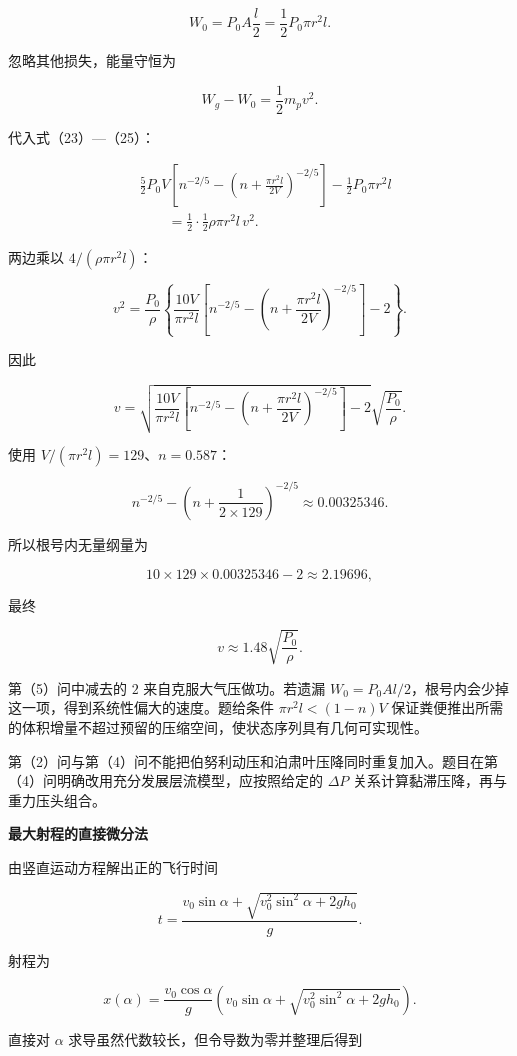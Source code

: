 \documentclass[12pt,a4paper,UTF8]{ctexart}
\begin{document}
\[
W_0=P_0A\frac l2=\frac12P_0\pi r^2l.
\tag{25}
\]

忽略其他损失，能量守恒为

\[
W_g-W_0=\frac12m_pv^2.
\tag{26}
\]

代入式（23）---（25）：

\[
\begin{aligned}
&\frac52P_0V\left[
n^{-2/5}
-\left(n+\frac{\pi r^2l}{2V}\right)^{-2/5}
\right]
-\frac12P_0\pi r^2l\\
&\qquad=\frac12\cdot\frac12\rho\pi r^2l\,v^2.
\end{aligned}
\]

两边乘以 \(4/(\rho\pi r^2l)\)：

\[
v^2=\frac{P_0}{\rho}\left\{
\frac{10V}{\pi r^2l}\left[
n^{-2/5}
-\left(n+\frac{\pi r^2l}{2V}\right)^{-2/5}
\right]-2
\right\}.
\]

因此

\[
\boxed{
v=\sqrt{
\frac{10V}{\pi r^2l}\left[
n^{-2/5}
-\left(n+\frac{\pi r^2l}{2V}\right)^{-2/5}
\right]-2
}\sqrt{\frac{P_0}{\rho}}
}.
\tag{27}
\]

使用 \(V/(\pi r^2l)=129\)、\(n=0.587\)：

\[
n^{-2/5}-\left(n+\frac1{2\times129}\right)^{-2/5}
\approx0.00325346.
\]

所以根号内无量纲量为

\[
10\times129\times0.00325346-2\approx2.19696,
\]

最终

\[
\boxed{v\approx1.48\sqrt{\frac{P_0}{\rho}}}.
\tag{28}
\]

第（5）问中减去的 \(2\) 来自克服大气压做功。若遗漏
\(W_0=P_0Al/2\)，根号内会少掉这一项，得到系统性偏大的速度。题给条件
\(\pi r^2l<(1-n)V\)
保证粪便推出所需的体积增量不超过预留的压缩空间，使状态序列具有几何可实现性。

第（2）问与第（4）问不能把伯努利动压和泊肃叶压降同时重复加入。题目在第（4）问明确改用充分发展层流模型，应按照给定的
\(\Delta P\) 关系计算黏滞压降，再与重力压头组合。

\textbf{最大射程的直接微分法}

由竖直运动方程解出正的飞行时间

\[
t=\frac{v_0\sin\alpha+
\sqrt{v_0^2\sin^2\alpha+2gh_0}}{g}.
\]

射程为

\[
x(\alpha)=\frac{v_0\cos\alpha}{g}
\left(v_0\sin\alpha+
\sqrt{v_0^2\sin^2\alpha+2gh_0}\right).
\]

直接对 \(\alpha\) 求导虽然代数较长，但令导数为零并整理后得到
\end{document}
